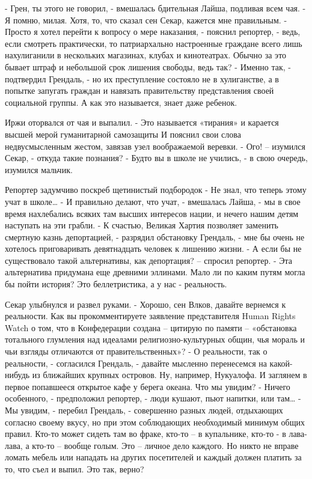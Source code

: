 \documentclass[10pt,final]{book}
\begin{document}
- Грен, ты этого не говорил, - вмешалась бдительная Лайша, подливая всем чая.
- Я помню, милая. Хотя, то, что сказал сен Секар, кажется мне правильным.
- Просто я хотел перейти к вопросу о мере наказания, - пояснил репортер, - ведь, если смотреть практически, то патриархально настроенные граждане всего лишь нахулиганили в нескольких магазинах, клубах и кинотеатрах. Обычно за это бывает штраф и небольшой срок лишения свободы, ведь так?
- Именно так, - подтвердил Грендаль, - но их преступление состояло не в хулиганстве, а в попытке запугать граждан и навязать правительству представления своей социальной группы. А как это называется, знает даже ребенок.

Иржи оторвался от чая и выпалил.
- Это называется «тирания» и карается высшей мерой гуманитарной самозащиты
И пояснил свои слова недвусмысленным жестом, завязав узел воображаемой веревки.
- Ого! -- изумился Секар, - откуда такие познания?
- Будто вы в школе не учились, - в свою очередь, изумился мальчик.

Репортер задумчиво поскреб щетинистый подбородок
- Не знал, что теперь этому учат в школе\ldots{}
- И правильно делают, что учат, - вмешалась Лайша, - мы в свое время нахлебались всяких там высших интересов нации, и нечего нашим детям наступать на эти грабли.
- К счастью, Великая Хартия позволяет заменить смертную казнь депортацией, - разрядил обстановку Грендаль, - мне бы очень не хотелось приговаривать девятнадцать человек к лишению жизни.
- А если бы не существовало такой альтернативы, как депортация? -- спросил репортер.
- Эта альтернатива придумана еще древними эллинами. Мало ли по каким путям могла бы пойти история? Это беллетристика, а у нас - реальность.

Секар улыбнулся и развел руками.
- Хорошо, сен Влков, давайте вернемся к реальности. Как вы прокомментируете заявление представителя Human Rights Watch о том, что в Конфедерации создана -- цитирую по памяти -- «обстановка тотального глумления над идеалами религиозно-культурных общин, чья мораль и чьи взгляды отличаются от правительственных»?
- О реальности, так о реальности, - согласился Грендаль, - давайте мысленно перенесемся на какой-нибудь из ближайших крупных островов. Ну, например, Нукуалофа. И заглянем в первое попавшееся открытое кафе у берега океана. Что мы увидим?
- Ничего особенного, - предположил репортер, - люди кушают, пьют напитки, или там\ldots{}
- Мы увидим, - перебил Грендаль, - совершенно разных людей, отдыхающих согласно своему вкусу, но при этом соблюдающих необходимый минимум общих правил. Кто-то может сидеть там во фраке, кто-то -- в купальнике, кто-то - в лава-лава, а кто-то -- вообще голым. Это -- личное дело каждого. Но никто не вправе ломать мебель или нападать на других посетителей и каждый должен платить за то, что съел и выпил. Это так, верно?
\end{document}
